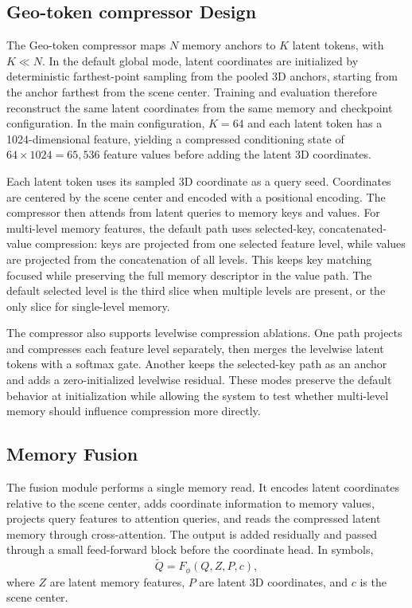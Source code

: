 \documentclass[letterpaper]{article} %
\newcommand{\geocomp}{Geo-token compressor}
\begin{document}
\subsection{\geocomp{} Design}

The \geocomp{} maps $N$ memory anchors to $K$ latent tokens, with $K \ll N$. In the default global mode, latent coordinates are initialized by deterministic farthest-point sampling from the pooled 3D anchors, starting from the anchor farthest from the scene center. Training and evaluation therefore reconstruct the same latent coordinates from the same memory and checkpoint configuration. In the main configuration, $K=64$ and each latent token has a 1024-dimensional feature, yielding a compressed conditioning state of $64\times1024=65{,}536$ feature values before adding the latent 3D coordinates.

Each latent token uses its sampled 3D coordinate as a query seed. Coordinates are centered by the scene center and encoded with a positional encoding. The compressor then attends from latent queries to memory keys and values. For multi-level memory features, the default path uses selected-key, concatenated-value compression: keys are projected from one selected feature level, while values are projected from the concatenation of all levels. This keeps key matching focused while preserving the full memory descriptor in the value path. The default selected level is the third slice when multiple levels are present, or the only slice for single-level memory.

The compressor also supports levelwise compression ablations. One path projects and compresses each feature level separately, then merges the levelwise latent tokens with a softmax gate. Another keeps the selected-key path as an anchor and adds a zero-initialized levelwise residual. These modes preserve the default behavior at initialization while allowing the system to test whether multi-level memory should influence compression more directly.

\subsection{Memory Fusion}

The fusion module performs a single memory read. It encodes latent coordinates relative to the scene center, adds coordinate information to memory values, projects query features to attention queries, and reads the compressed latent memory through cross-attention. The output is added residually and passed through a small feed-forward block before the coordinate head. In symbols,
\begin{equation}
    \widetilde{Q} = F_{\phi}(Q, Z, P, c),
\end{equation}
where $Z$ are latent memory features, $P$ are latent 3D coordinates, and $c$ is the scene center.
\end{document}
